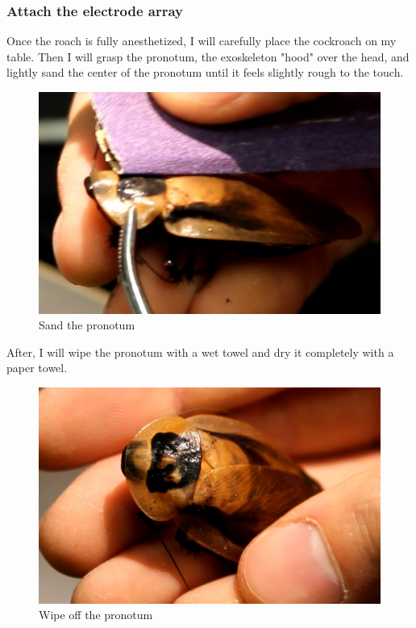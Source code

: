 \subsubsection{Attach the electrode array}
Once the roach is fully anesthetized, I will carefully place the cockroach on my table. Then I will grasp the pronotum, the exoskeleton "hood" over the head, and lightly sand the center of the pronotum until it feels slightly rough to the touch. 
{\begin{figure}[ht!]
\centering
\includegraphics[scale=0.25]{Surgery Photos/sand.jpg}
\caption{Sand the pronotum}
\label{fig:sand}
\end{figure}}
After, I will wipe the pronotum with a wet towel and dry it completely with a paper towel. 
{\begin{figure}[ht!]
\centering
\includegraphics[scale=0.15]{Surgery Photos/wipe.jpg}
\caption{Wipe off the pronotum}
\label{fig:wipe}
\end{figure}}
